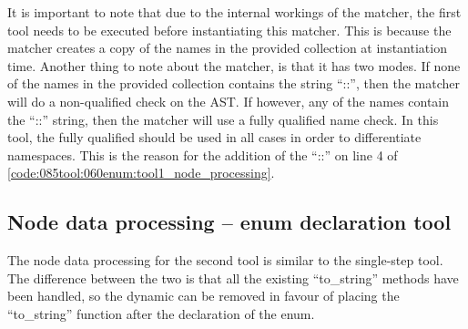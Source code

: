 It is important to note that due to the internal workings of the  matcher, the first tool needs to be executed before instantiating this matcher.
This is because the  matcher creates a copy of the names in the provided collection at instantiation time.
Another thing to note about the  matcher, is that it has two modes.
If none of the names in the provided collection contains the string ``::'', then the matcher will do a non-qualified check on the AST. If however, any of the names contain the ``::'' string, then the matcher will use a fully qualified name check. In this tool, the fully qualified should be used in all cases in order to differentiate namespaces. 
This is the reason for the addition of the ``::'' on line 4 of \cref{code:085tool:060enum:tool1_node_processing}.

\subsection{Node data processing -- enum declaration tool}

The node data processing for the second tool is similar to the single-step tool. The difference between the two is that all the existing ``to\_string'' methods have been handled, so the dynamic  can be removed in favour of placing the ``to\_string'' function after the declaration of the enum.